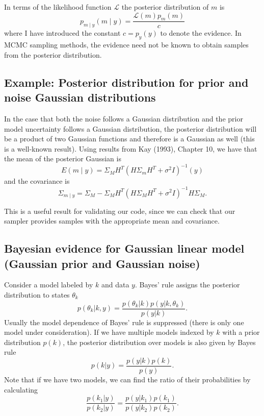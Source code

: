 \documentclass[11pt]{article}
\begin{document}
In terms of the likelihood function $\mathcal{L}$ the posterior distribution of $m$ is
\begin{equation}
p_{m \mid y}(m \mid y)=\frac{\mathcal{L}(m) p_{m}(m)}{c}
\end{equation}
where I have introduced the constant $c=p_{y}(y)$ to denote the evidence. In MCMC sampling methods, the evidence need not be known to obtain samples from the posterior distribution.

\subsection{Example: Posterior distribution for prior and noise Gaussian distributions}
\label{gaussiangaussian}

In the case that both the noise follows a Gaussian distribution and the prior model uncertainty follows a Gaussian distribution, the posterior distribution will be a product of two Gaussian functions and therefore is a Gaussian as well (this is a well-known result). Using results from Kay (1993), Chapter 10, we have that the mean of the posterior Gaussian is
\begin{equation}
\label{eq:gaussianpostmean}
E(m \mid y)=\Sigma_{M} H^{T}\left(H \Sigma_{m} H^{T}+\sigma^{2} I\right)^{-1}(y)
\end{equation}
and the covariance is
\begin{equation}
\label{eq:gaussianpostcov}
\Sigma_{m \mid y}=\Sigma_{M}-\Sigma_{M} H^{T}\left(H \Sigma_{M} H^{T}+\sigma^{2} I\right)^{-1} H \Sigma_{M} .
\end{equation}

This is a useful result for validating our code, since we can check that our sampler provides samples with the appropriate mean and covariance.

\subsection{Bayesian evidence for Gaussian linear model (Gaussian prior and Gaussian noise)}
Consider a model labeled by $k$ and data $y$.
Bayes' rule assigns the posterior distribution to states $\theta_k$ 
\begin{equation}
	p(\theta_k | k, y) = \frac{p(\theta_k | k) p(y | k, \theta_k)}{p(y | k)} . 
\end{equation}
Usually the model dependence of Bayes' rule is suppressed (there is only one model under consideration).
If we have multiple models indexed by $k$ with a prior distribution $p(k)$, the posterior distribution over models is also given by Bayes rule
\begin{equation}
	p(k | y) = \frac{p(y | k ) p(k)}{p(y)} .
\end{equation}
Note that if we have two models, we can find the ratio of their probabilities by calculating \begin{equation} 
	\frac{p(k_1 | y)}{p(k_2 | y)} = \frac{p(y | k_1 ) p(k_1)}{p(y | k_2) p(k_2)} .
\end{equation}
\end{document}
